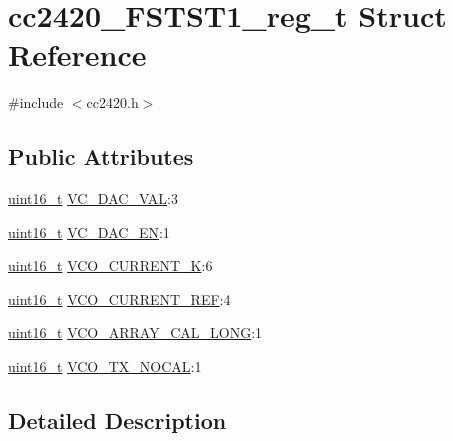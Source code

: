 \hypertarget{structcc2420___f_s_t_s_t1__reg__t}{}\section{cc2420\+\_\+\+F\+S\+T\+S\+T1\+\_\+reg\+\_\+t Struct Reference}
\label{structcc2420___f_s_t_s_t1__reg__t}


{\ttfamily \#include $<$cc2420.\+h$>$}

\subsection*{Public Attributes}
\begin{DoxyCompactItemize}
\item 
\hyperlink{_p_e___types_8h_a1f1825b69244eb3ad2c7165ddc99c956}{uint16\+\_\+t} \hyperlink{structcc2420___f_s_t_s_t1__reg__t_a51edfdbc7ed4b61170f24d2d3d5b5b67}{V\+C\+\_\+\+D\+A\+C\+\_\+\+V\+AL}\+:3
\item 
\hyperlink{_p_e___types_8h_a1f1825b69244eb3ad2c7165ddc99c956}{uint16\+\_\+t} \hyperlink{structcc2420___f_s_t_s_t1__reg__t_a9577bcfd60bf259dd51b784333cb46c8}{V\+C\+\_\+\+D\+A\+C\+\_\+\+EN}\+:1
\item 
\hyperlink{_p_e___types_8h_a1f1825b69244eb3ad2c7165ddc99c956}{uint16\+\_\+t} \hyperlink{structcc2420___f_s_t_s_t1__reg__t_aae4417ede6f2b108e3062fbeff19e1d0}{V\+C\+O\+\_\+\+C\+U\+R\+R\+E\+N\+T\+\_\+K}\+:6
\item 
\hyperlink{_p_e___types_8h_a1f1825b69244eb3ad2c7165ddc99c956}{uint16\+\_\+t} \hyperlink{structcc2420___f_s_t_s_t1__reg__t_af33974d1624ee75478244639af29d303}{V\+C\+O\+\_\+\+C\+U\+R\+R\+E\+N\+T\+\_\+\+R\+EF}\+:4
\item 
\hyperlink{_p_e___types_8h_a1f1825b69244eb3ad2c7165ddc99c956}{uint16\+\_\+t} \hyperlink{structcc2420___f_s_t_s_t1__reg__t_a4ed772c52c44810879c0fc6b5431550d}{V\+C\+O\+\_\+\+A\+R\+R\+A\+Y\+\_\+\+C\+A\+L\+\_\+\+L\+O\+NG}\+:1
\item 
\hyperlink{_p_e___types_8h_a1f1825b69244eb3ad2c7165ddc99c956}{uint16\+\_\+t} \hyperlink{structcc2420___f_s_t_s_t1__reg__t_a9afde96277312d0b5dc94c4c9e1e263b}{V\+C\+O\+\_\+\+T\+X\+\_\+\+N\+O\+C\+AL}\+:1
\end{DoxyCompactItemize}


\subsection{Detailed Description}


